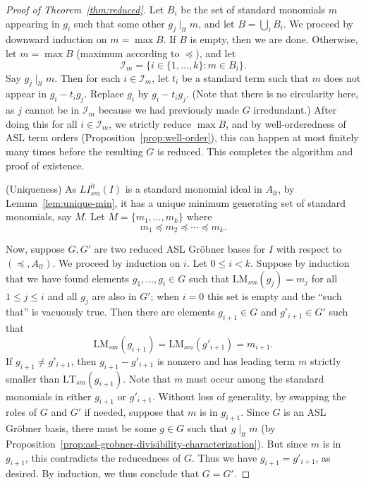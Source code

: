 \documentclass[11pt,reqno]{amsart}
\newcommand{\ltdivides}{\mid_{lt}}
\newcommand{\lmsm}{\text{LM}_{sm}}
\newcommand{\ltsm}{\text{LT}_{sm}}
\newcommand{\lismlt}{LI_{sm}^{lt}}
\theoremstyle{definition}
\numberwithin{equation}{section}
\begin{document}
\begin{proof}[Proof of Theorem~\ref{thm:reduced}]
Let $B_i$ be the set of standard monomials $m$ appearing in $g_i$ such that some other $g_j \ltdivides m$, and let $B = \bigcup_i B_i$. We proceed by downward induction on $m = \max B$. If $B$ is empty, then we are done. Otherwise, let $m = \max B$ (maximum according to $\preceq$), and let 
\[
\mathcal{I}_m = \{i \in \{1,\dotsc,k\} : m \in B_i\}.
\]
Say $g_j \ltdivides m$. Then for each $i \in \mathcal{I}_m$, let $t_i$ be a standard term such that $m$ does not appear in $g_i - t_i g_j$. Replace $g_i$ by $g_i - t_i g_j$. (Note that there is no circularity here, as $j$ cannot be in $\mathcal{I}_m$ because we had previously made $G$ irredundant.) After doing this for all $i \in \mathcal{I}_m$, we strictly reduce $\max B$, and by well-orderedness of ASL term orders (Proposition~\ref{prop:well-order}), this can happen at most finitely many times before the resulting $G$ is reduced. This completes the algorithm and proof of existence.

(Uniqueness) As $\lismlt(I)$ is a standard monomial ideal in $A_{lt}$, by Lemma~\ref{lem:unique-min}, it has a unique minimum generating set of standard monomials, say $M$. Let $M = \{m_1, \dotsc, m_k \}$ where 
\[
m_1 \preceq m_2 \preceq \dotsb \preceq m_k.
\] 

Now, suppose $G,G'$ are two reduced ASL Gröbner bases for $I$ with respect to $(\preceq, A_{lt})$. We proceed by induction on $i$. Let $0 \leq i < k$. Suppose by induction that we have found elements $g_1, \dotsc, g_i \in G$ such that $\lmsm(g_j) = m_j$ for all $1 \leq j \leq i$ and all $g_j$ are also in $G'$; when $i=0$ this set is empty and the ``such that'' is vacuously true. Then there are elements $g_{i+1} \in G$ and $g'_{i+1} \in G'$ such that 
\[
\lmsm(g_{i+1}) = \lmsm(g'_{i+1}) = m_{i+1}.
\]
If $g_{i+1} \neq g'_{i+1}$, then $g_{i+1} - g'_{i+1}$ is nonzero and has leading term $m$ strictly smaller than $\ltsm(g_{i+1})$. Note that $m$ must occur among the standard monomials in either $g_{i+1}$ or $g'_{i+1}$. Without loss of generality, by swapping the roles of $G$ and $G'$ if needed, suppose that $m$ is in $g_{i+1}$. Since $G$ is an ASL Gröbner basis, there must be some $g \in G$ such that $g \ltdivides m$ (by Proposition~\ref{prop:asl-grobner-divisibility-characterization}). But since $m$ is in $g_{i+1}$, this contradicts the reducedness of $G$. Thus we have $g_{i+1} = g'_{i+1}$, as desired. By induction, we thus conclude that $G = G'$.
\end{proof}

\end{document}
